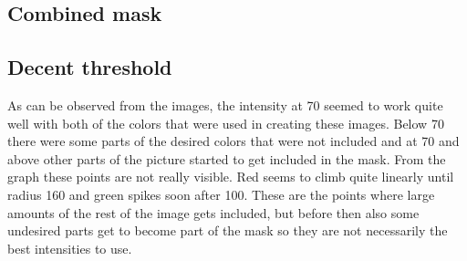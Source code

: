 \documentclass{article}
\begin{document}
\subsection{Combined mask}
\subsection{Decent threshold}
As can be observed from the images, the intensity at 70 seemed to work quite well with both of the colors that were used in creating these images. Below 70 there were some parts of the desired colors that were not included and at 70 and above other parts of the picture started to get included in the mask. From the graph these points are not really visible. Red seems to climb quite linearly until radius 160 and green spikes soon after 100. These are the points where large amounts of the rest of the image gets included, but before then also some undesired parts get to become part of the mask so they are not necessarily the best intensities to use.
\newpage
\end{document}
